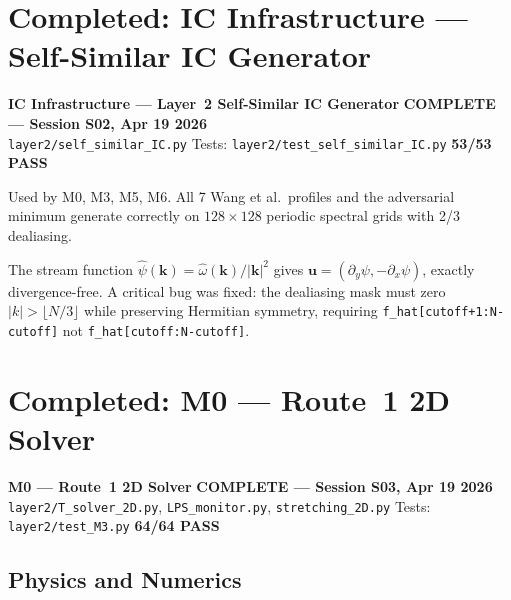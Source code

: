\documentclass[11pt, a4paper]{article}
\theoremstyle{definition}
\theoremstyle{remark}
\newenvironment{milestone}{%
  \begin{tcolorbox}[colback=tfblue!5, colframe=tfblue!50!black,
    breakable, left=4pt, right=4pt, top=4pt, bottom=4pt]
}{%
  \end{tcolorbox}
}
\begin{document}
\section{Completed: IC Infrastructure --- Self-Similar IC Generator}

\begin{milestone}
  \textbf{IC Infrastructure --- Layer~2 Self-Similar IC Generator}
  \hfill {\color{passgreen}\textbf{COMPLETE --- Session S02, Apr 19 2026}}\\[4pt]
  \texttt{layer2/self\_similar\_IC.py} \quad Tests: \texttt{layer2/test\_self\_similar\_IC.py}
  \quad \textbf{53/53 PASS}
\end{milestone}

Used by M0, M3, M5, M6. All 7 Wang et al.\ profiles and the adversarial minimum generate
correctly on $128\times128$ periodic spectral grids with 2/3 dealiasing.

The stream function $\hat\psi(\mathbf{k}) = \hat\omega(\mathbf{k})/|\mathbf{k}|^2$
gives $\mathbf{u} = (\partial_y\psi, -\partial_x\psi)$, exactly divergence-free.
A critical bug was fixed: the dealiasing mask must zero $|k| > \lfloor N/3\rfloor$
while preserving Hermitian symmetry, requiring
\texttt{f\_hat[cutoff+1:N-cutoff]} not \texttt{f\_hat[cutoff:N-cutoff]}.

\section{Completed: M0 --- Route~1 2D Solver}

\begin{milestone}
  \textbf{M0 --- Route~1 2D Solver}
  \hfill {\color{passgreen}\textbf{COMPLETE --- Session S03, Apr 19 2026}}\\[4pt]
  \texttt{layer2/T\_solver\_2D.py}, \texttt{LPS\_monitor.py}, \texttt{stretching\_2D.py}
  \quad Tests: \texttt{layer2/test\_M3.py} \quad \textbf{64/64 PASS}
\end{milestone}

\subsection{Physics and Numerics}
\end{document}
